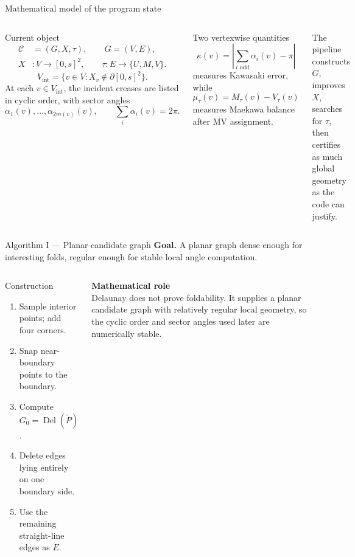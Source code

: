 \documentclass[aspectratio=169,10pt]{beamer}
\newcommand{\CP}{\mathcal{C}}
\begin{document}
\begin{frame}{Mathematical model of the program state}
\begin{columns}[T,onlytextwidth]
\begin{block}{Current object}
\small
\[
\begin{aligned}
\CP&=(G,X,\tau),\qquad G=(V,E),\\
X&:V\to [0,s]^2,\qquad \tau:E\to\{U,M,V\}.
\end{aligned}
\]
\[
V_{\mathrm{int}}=\{v\in V:X_v\notin \partial[0,s]^2\}.
\]
At each \(v\in V_{\mathrm{int}}\), the incident creases are listed in cyclic
order, with sector angles
\[
\alpha_1(v),\dots,\alpha_{2m(v)}(v),\qquad
\sum_i\alpha_i(v)=2\pi.
\]
\end{block}

\begin{alertblock}{Two vertexwise quantities}
\small
\[
\kappa(v)=\left|\sum_{i\text{ odd}}\alpha_i(v)-\pi\right|
\]
measures Kawasaki error, while
\[
\mu_\tau(v)=M_\tau(v)-V_\tau(v)
\]
measures Maekawa balance after MV assignment.
\end{alertblock}

\smallskip
\small The pipeline constructs \(G\), improves \(X\), searches for \(\tau\),
then certifies as much global geometry as the code can justify.
\end{columns}
\end{frame}

\begin{frame}{Algorithm I — Planar candidate graph}
\textbf{Goal.} A planar graph dense enough for interesting folds, regular
enough for stable local angle computation.
\medskip

\begin{columns}[T,onlytextwidth]
\begin{block}{Construction}
\begin{enumerate}\small
  \item Sample interior points; add four corners.
  \item Snap near-boundary points to the boundary.
  \item Compute \(G_0=\operatorname{Del}(\widetilde P)\).
  \item Delete edges lying entirely on one boundary side.
  \item Use the remaining straight-line edges as \(E\).
\end{enumerate}
\end{block}

\textbf{Mathematical role}\\[3pt]
\small Delaunay does not prove foldability. It supplies a planar candidate
graph with relatively regular local geometry, so the cyclic order and sector
angles used later are numerically stable.
\end{columns}
\end{frame}
\end{document}
